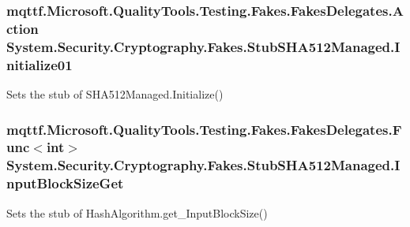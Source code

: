\hypertarget{class_system_1_1_security_1_1_cryptography_1_1_fakes_1_1_stub_s_h_a512_managed_a1f756871d6ad93a59533054b6f9efbe2}{
\subsubsection[{Initialize01}]{\setlength{\rightskip}{0pt plus 5cm}mqttf.\-Microsoft.\-Quality\-Tools.\-Testing.\-Fakes.\-Fakes\-Delegates.\-Action System.\-Security.\-Cryptography.\-Fakes.\-Stub\-S\-H\-A512\-Managed.\-Initialize01}}\label{class_system_1_1_security_1_1_cryptography_1_1_fakes_1_1_stub_s_h_a512_managed_a1f756871d6ad93a59533054b6f9efbe2}


Sets the stub of S\-H\-A512\-Managed.\-Initialize()

\hypertarget{class_system_1_1_security_1_1_cryptography_1_1_fakes_1_1_stub_s_h_a512_managed_a2c0acd2bbf0368199c628775b816dfef}{
\subsubsection[{Input\-Block\-Size\-Get}]{\setlength{\rightskip}{0pt plus 5cm}mqttf.\-Microsoft.\-Quality\-Tools.\-Testing.\-Fakes.\-Fakes\-Delegates.\-Func$<$int$>$ System.\-Security.\-Cryptography.\-Fakes.\-Stub\-S\-H\-A512\-Managed.\-Input\-Block\-Size\-Get}}\label{class_system_1_1_security_1_1_cryptography_1_1_fakes_1_1_stub_s_h_a512_managed_a2c0acd2bbf0368199c628775b816dfef}


Sets the stub of Hash\-Algorithm.\-get\-\_\-\-Input\-Block\-Size()

